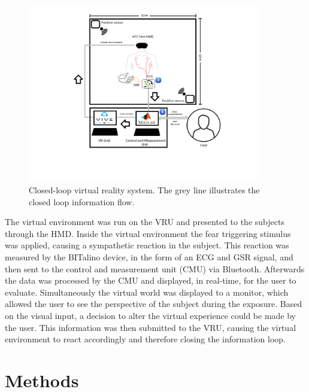 \begin{figure}[ht]
\centering
\includegraphics[width=0.9\textwidth]{images/setup.png}
\caption{Closed-loop virtual reality system. The grey line illustrates the closed loop information flow.}
\label{setupImg}
\end{figure}

The virtual environment was run on the VRU and presented to the subjects through the HMD. Inside the virtual environment the fear triggering stimulus was applied, causing a sympathetic reaction in the subject. This reaction was measured by the BITalino device, in the form of an ECG and GSR signal, and then sent to the control and measurement unit (CMU) via Bluetooth. Afterwards the data was processed by the CMU and displayed, in real-time, for the user to evaluate. Simultaneously the virtual world was displayed to a monitor, which allowed the user to see the perspective of the subject during the exposure. Based on the visual input, a decision to alter the virtual experience could be made by the user. This information was then submitted to the VRU, causing the virtual environment to react accordingly and therefore closing the information loop.


\newpage
\section{Methods}\label{Methods}

